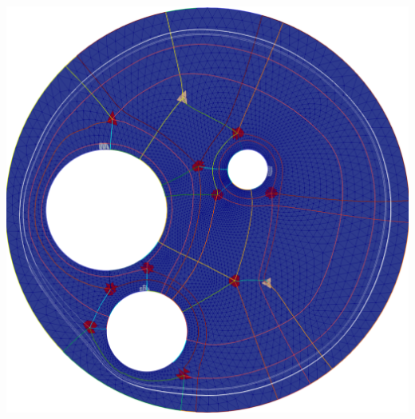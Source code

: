 \documentclass[a0paper,portrait, fontscale=0.33]{baposter}
\begin{document}
\begin{poster}
{\begin{minipage}[!Ht]{0.49\linewidth}
\bigskip
\end{minipage}
\hspace{0.005\linewidth}
\begin{minipage}[!Ht]{0.48\linewidth}
\includegraphics[width=\textwidth]{Circle_with_circle_holes_refSS1-cycle}
\label{fig:figure10}
\end{minipage}
%
%	
%
}


\end{poster}
\end{document}
